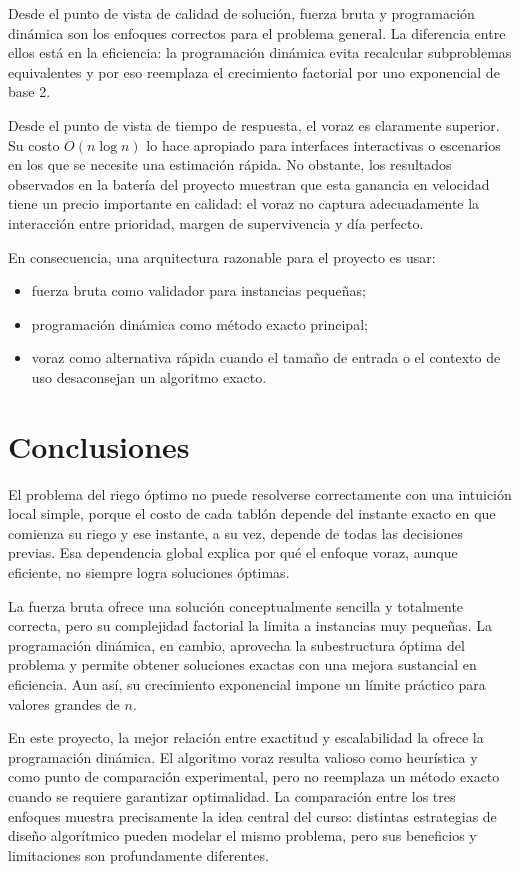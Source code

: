 \documentclass[12pt,a4paper]{article}
\begin{document}
Desde el punto de vista de calidad de soluci\'on, fuerza bruta y programaci\'on din\'amica son los enfoques correctos para el problema general. La diferencia entre ellos est\'a en la eficiencia: la programaci\'on din\'amica evita recalcular subproblemas equivalentes y por eso reemplaza el crecimiento factorial por uno exponencial de base 2.

Desde el punto de vista de tiempo de respuesta, el voraz es claramente superior. Su costo \(O(n\log n)\) lo hace apropiado para interfaces interactivas o escenarios en los que se necesite una estimaci\'on r\'apida. No obstante, los resultados observados en la bater\'ia del proyecto muestran que esta ganancia en velocidad tiene un precio importante en calidad: el voraz no captura adecuadamente la interacci\'on entre prioridad, margen de supervivencia y d\'ia perfecto.

En consecuencia, una arquitectura razonable para el proyecto es usar:

\begin{itemize}
  \item fuerza bruta como validador para instancias peque\~nas;
  \item programaci\'on din\'amica como m\'etodo exacto principal;
  \item voraz como alternativa r\'apida cuando el tama\~no de entrada o el contexto de uso desaconsejan un algoritmo exacto.
\end{itemize}

\section{Conclusiones}

El problema del riego \'optimo no puede resolverse correctamente con una intuici\'on local simple, porque el costo de cada tabl\'on depende del instante exacto en que comienza su riego y ese instante, a su vez, depende de todas las decisiones previas. Esa dependencia global explica por qu\'e el enfoque voraz, aunque eficiente, no siempre logra soluciones \'optimas.

La fuerza bruta ofrece una soluci\'on conceptualmente sencilla y totalmente correcta, pero su complejidad factorial la limita a instancias muy peque\~nas. La programaci\'on din\'amica, en cambio, aprovecha la subestructura \'optima del problema y permite obtener soluciones exactas con una mejora sustancial en eficiencia. Aun as\'i, su crecimiento exponencial impone un l\'imite pr\'actico para valores grandes de \(n\).

En este proyecto, la mejor relaci\'on entre exactitud y escalabilidad la ofrece la programaci\'on din\'amica. El algoritmo voraz resulta valioso como heur\'istica y como punto de comparaci\'on experimental, pero no reemplaza un m\'etodo exacto cuando se requiere garantizar optimalidad. La comparaci\'on entre los tres enfoques muestra precisamente la idea central del curso: distintas estrategias de dise\~no algor\'itmico pueden modelar el mismo problema, pero sus beneficios y limitaciones son profundamente diferentes.
\end{document}

